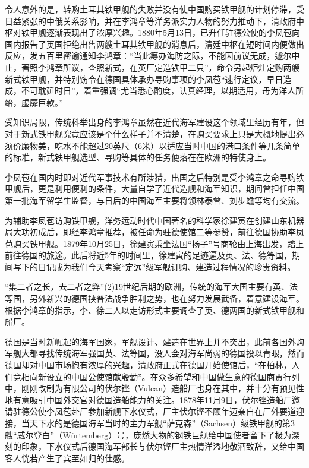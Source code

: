 \documentclass[12pt,UTF8]{ctexbook}
\begin{document}
令人意外的是，转购土耳其铁甲舰的失败并没有使中国购买铁甲舰的计划停滞，受日益紧张的中俄关系影响，并在李鸿章等洋务派实力人物的努力推动下，清政府中枢对铁甲舰逐渐表现出了浓厚兴趣。1880年5月13日，已升任驻德公使的李凤苞向国内报告了英国拒绝出售两艘土耳其铁甲舰的消息后，清廷中枢在短时间内便做出反应，发五百里密谕通知李鸿章：“当此筹办海防之际，不能因前议无成，遽尔中止，著照李鸿章所议，查照新式，在英厂定造铁甲二只”，命令另起炉灶定购两艘新式铁甲舰，并特别饬令在德国具体承办寻购事项的李凤苞“速行定议，早日造成，不可耽延时日”，着重强调“尤当悉心酌度，认真经理，以期适用，毋为洋人所绐，虚靡巨款。”

受知识局限，传统科举出身的李鸿章虽然在近代海军建设这个领域里经历有年，但对于新式铁甲舰究竟应该是个什么样子并不清楚，在购买要求上只是大概地提出必须价廉物美，吃水不能超过20英尺（6米）以适应当时中国的港口条件等几条简单的标准，新式铁甲舰选型、寻购等具体的任务便落在在欧洲的特使身上。

李凤苞在国内时即对近代军事技术有所涉猎，出国之后特别是受李鸿章之命寻购铁甲舰后，更是利用便利的条件，大量自学了近代造舰和海军知识，期间曾担任中国第一批海军留学生监督，与日后的中国海军主要将领林泰曾、刘步蟾等均有交流。

为辅助李凤苞访购铁甲舰，洋务运动时代中国著名的科学家徐建寅在创建山东机器局大功初成后，即经李鸿章推荐，被任命为驻德使馆二等参赞，前往德国协助李凤苞购买铁甲舰。1879年10月25日，徐建寅乘坐法国“扬子”号商轮由上海出发，踏上前往德国的旅途。此后将近5年的时间里，徐建寅的足迹遍及英、法、德等国，期间写下的日记成为我们今天考察“定远”级军舰订购、建造过程情况的珍贵资料。

“集二者之长，去二者之弊”(2)19世纪后期的欧洲，传统的海军大国主要有英、法等国，另外新兴的德国挟普法战争胜利之势，也在努力发展武备，着意建设海军。根据李鸿章的指示，李、徐二人以走访形式主要调查了英、德两国的新式铁甲舰和船厂。

德国是当时新崛起的海军国家，军舰设计、建造在世界上并不突出，此前各国外购军舰大都寻找传统海军强国英、法等国，没人会对海军尚弱的德国投以青眼，然而德国却对中国市场抱有浓厚的兴趣，清政府正式在德国开始使馆后，“在柏林，人们竞相向新设立的中国公使馆献殷勤”。在众多希望和中国做生意的德国商贾行列中，刚刚改制为有限公司的伏尔铿（Vulcan）造船厂也身在其中，并十分有预见性地有意吸引中国外交官对德国造船能力的关注。1878年11月9日，伏尔铿造船厂邀请驻德公使李凤苞赴厂参加新舰下水仪式，厂主伏尔铿不顾年迈亲自在厂外要道迎接，当天下水的是德国海军当时的主力军舰“萨克森”（Sachsen）级铁甲舰的第3艘“威尔登白”（Würtemberg）号，庞然大物的钢铁巨舰给中国使者留下了极为深刻的印象，下水仪式后德国海军部长与伏尔铿厂主热情洋溢地敬酒致辞，又给中国客人恍若产生了宾至如归的佳感。
\end{document}
